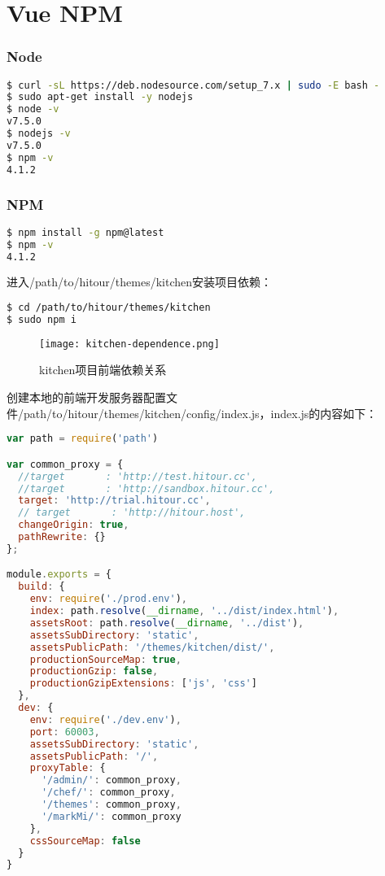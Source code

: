 \part{Vue NPM}



\section{Node}


\begin{lstlisting}[language=bash]
$ curl -sL https://deb.nodesource.com/setup_7.x | sudo -E bash -
$ sudo apt-get install -y nodejs
$ node -v
v7.5.0
$ nodejs -v
v7.5.0
$ npm -v
4.1.2
\end{lstlisting}


\section{NPM}

\begin{lstlisting}[language=bash]
$ npm install -g npm@latest
$ npm -v
4.1.2
\end{lstlisting}

进入/path/to/hitour/themes/kitchen安装项目依赖：


\begin{lstlisting}[language=bash]
$ cd /path/to/hitour/themes/kitchen
$ sudo npm i
\end{lstlisting}

\begin{figure}[htbp]
\centering
\texttt{[image: kitchen-dependence.png]}
\caption{kitchen项目前端依赖关系}
\end{figure}


创建本地的前端开发服务器配置文件/path/to/hitour/themes/kitchen/config/index.js，index.js的内容如下：

\begin{lstlisting}[language=JavaScript]
var path = require('path')

var common_proxy = {
  //target       : 'http://test.hitour.cc',
  //target       : 'http://sandbox.hitour.cc',
  target: 'http://trial.hitour.cc',
  // target       : 'http://hitour.host',
  changeOrigin: true,
  pathRewrite: {}
};

module.exports = {
  build: {
    env: require('./prod.env'),
    index: path.resolve(__dirname, '../dist/index.html'),
    assetsRoot: path.resolve(__dirname, '../dist'),
    assetsSubDirectory: 'static',
    assetsPublicPath: '/themes/kitchen/dist/',
    productionSourceMap: true,
    productionGzip: false,
    productionGzipExtensions: ['js', 'css']
  },
  dev: {
    env: require('./dev.env'),
    port: 60003,
    assetsSubDirectory: 'static',
    assetsPublicPath: '/',
    proxyTable: {
      '/admin/': common_proxy,
      '/chef/': common_proxy,
      '/themes': common_proxy,
      '/markMi/': common_proxy
    },
    cssSourceMap: false
  }
}
\end{lstlisting}


